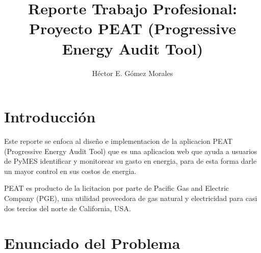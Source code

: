 \documentclass{article}
\author{Héctor E. Gómez Morales}
\title{Reporte Trabajo Profesional: Proyecto PEAT (Progressive Energy
  Audit Tool)}
\begin{document}
\maketitle
\tableofcontents
\section{Introducción}
Este reporte se enfoca al diseño e implementacion de la aplicacion
PEAT (Progressive Energy Audit Tool) que es una aplicacion web que
ayuda a usuarios de PyMES identificar y monitorear su gasto en
energia, para de esta forma darle un mayor control en sus costos de
energia.

PEAT es producto de la licitacion por parte de Pacific Gas and
Electric Company (PGE), una utilidad  proveedora de gas natural y
electricidad para casi dos tercios del norte de California, USA.
\section{Enunciado del Problema}
\end{document}
